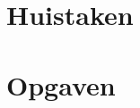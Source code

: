 \documentclass[a4paper,10pt]{book}
\begin{document}
\chapter{Huistaken}



\appendix
\chapter{Opgaven}





%
\end{document}
